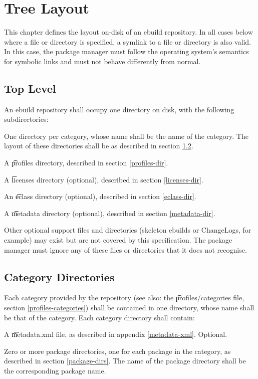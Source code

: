 \chapter{Tree Layout}

This chapter defines the layout on-disk of an ebuild repository. In all cases below where a file or
directory is specified, a symlink to a file or directory is also valid. In this case, the package
manager must follow the operating system's semantics for symbolic links and must not behave
differently from normal.

\section{Top Level}

An ebuild repository shall occupy one directory on disk, with the following subdirectories:
\begin{compactitem}
\item One directory per category, whose name shall be the name of the category. The layout of
    these directories shall be as described in section \ref{category-dirs}.
\item A \t{profiles} directory, described in section \ref{profiles-dir}.
\item A \t{licenses} directory (optional), described in section \ref{licenses-dir}.
\item An \t{eclass} directory (optional), described in section \ref{eclass-dir}.
\item A \t{metadata} directory (optional), described in section \ref{metadata-dir}.
\item Other optional support files and directories (skeleton ebuilds or ChangeLogs,
    for example) may exist but are not covered by this specification. The package manager must
    ignore any of these files or directories that it does not recognise.

\end{compactitem}

\section{Category Directories}
\label{category-dirs}

Each category provided by the repository (see also: the \t{profiles/categories} file, section
\ref{profiles-categories}) shall be contained in one directory, whose name shall be that of the
category. Each category directory shall contain:
\begin{compactitem}
\item A \t{metadata.xml} file, as described in appendix \ref{metadata-xml}\@. Optional.
\item Zero or more package directories, one for each package in the category, as described in section
    \ref{package-dirs}. The name of the package directory shall be the corresponding package name.
\end{compactitem}

